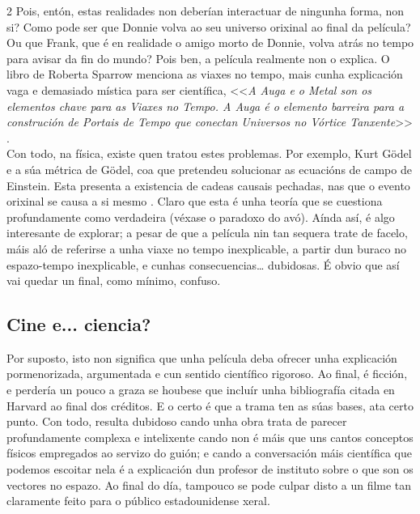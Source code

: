 \begin{refsection}
\begin{multicols}{2}
Pois, entón, estas realidades non deberían interactuar de ningunha forma, non
si? Como pode ser que Donnie volva ao seu universo orixinal ao final da
película? Ou que Frank, que é en realidade o amigo morto de Donnie, volva atrás
no tempo para avisar da fin do mundo? Pois ben, a película realmente non o
explica. O libro de Roberta Sparrow menciona as viaxes no tempo, mais cunha
explicación vaga e demasiado mística para ser científica, <<\textit{A Auga e o
Metal son os elementos chave para as Viaxes no Tempo. A Auga é o elemento
barreira para a construción de Portais de Tempo que conectan Universos no
Vórtice Tanxente}>> \cite{donnie_darko}.\\

Con todo, na física, existe quen tratou estes problemas. Por exemplo, Kurt
Gödel e a súa métrica de Gödel, coa que pretendeu solucionar as ecuacións de
campo de Einstein. Esta presenta a existencia de cadeas causais pechadas, nas
que o evento orixinal se causa a si mesmo \cite{nunez.r_2021}. Claro que esta é unha
teoría que se cuestiona profundamente como verdadeira (véxase o paradoxo do
avó). Aínda así, é algo interesante de explorar; a pesar de que a película nin
tan sequera trate de facelo, máis aló de referirse a unha viaxe no tempo
inexplicable, a partir dun buraco no espazo-tempo inexplicable, e cunhas
consecuencias… dubidosas. É obvio que así vai quedar un final, como mínimo,
confuso.

\subsection*{Cine e... ciencia?}

Por suposto, isto non significa que unha película deba ofrecer unha explicación
pormenorizada, argumentada e cun sentido científico rigoroso. Ao final, é
ficción, e perdería un pouco a graza se houbese que incluír unha bibliografía
citada en Harvard ao final dos créditos. E o certo é que a trama ten as súas
bases, ata certo punto. Con todo, resulta dubidoso cando unha obra trata de
parecer profundamente complexa e intelixente cando non é máis que uns cantos
conceptos físicos empregados ao servizo do guión; e cando a conversación máis
científica que podemos escoitar nela é a explicación dun profesor de instituto
sobre o que son os vectores no espazo. Ao final do día, tampouco se pode culpar
disto a un filme tan claramente feito para o público estadounidense xeral.

\nocite{deutsch.m_1994}
\nocite{donnie_darko}
\nocite{gribbin.j_2020}
\nocite{nunez.r_2021}
\nocite{wisecrack_2019}

\printbibliography

\end{multicols}
\end{refsection}
